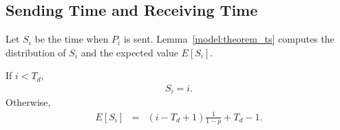 \subsection{Sending Time and Receiving Time}
Let $S_i$ be the time when $P_i$ is sent. %
Lemma~\ref{model:theorem_ts} computes the distribution of $S_i$ and the expected value $E[S_i]$.
\begin{lemma} \label{model:theorem_ts}
If $i < T_{d}$, %
\begin{eqnarray*}
S_i = i.
\end{eqnarray*}
Otherwise, 
\begin{eqnarray*}
E[S_i]          &=& (i - T_d + 1)\frac{1}{1-p} + T_d - 1.
\end{eqnarray*}
\end{lemma}
\if{}
